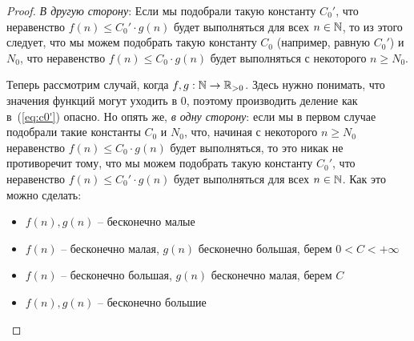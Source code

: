 \begin{enumerate}
\begin{enumerate}
\begin{proof}
        \textit{В другую сторону}:
        Если мы подобрали такую константу $C_0'$, что неравенство $f(n) \leq C_0' \cdot g(n)$ будет выполняться для всех $n \in \mathbb{N}$, то из этого следует, что мы можем подобрать такую константу $C_0$ (например, равную $C_0'$) и $N_0$, что неравенство $f(n) \leq C_0 \cdot g(n)$ будет выполняться с некоторого $n \geq N_0$.

        Теперь рассмотрим случай, когда $f, g: \mathbb{N} \to \mathbb{R}_{>0}$. Здесь нужно понимать, что значения функций могут уходить в 0, поэтому производить деление как в~(\ref{eq:c0'}) опасно. Но опять же, \textit{в одну сторону}: если мы в первом случае подобрали такие константы $C_0$ и $N_0$, что, начиная с некоторого $n \geq N_0$ неравенство $f(n) \leq C_0 \cdot g(n)$ будет выполняться, то это никак не противоречит тому, что мы можем подобрать такую константу $C_0'$, что неравенство $f(n) \leq C_0' \cdot g(n)$ будет выполняться для всех $n \in \mathbb{N}$. Как это можно сделать:
        \begin{itemize}
          \item $f(n), g(n)$ -- бесконечно малые
          \item $f(n)$ -- бесконечно малая, $g(n)$ бесконечно большая, берем $0 < C < + \infty$ 
          \item $f(n)$ -- бесконечно большая, $g(n)$ бесконечно малая, берем $C$
          \item $f(n), g(n)$ -- бесконечно большие
        \end{itemize}





\end{proof}
\end{enumerate}
\end{enumerate}
